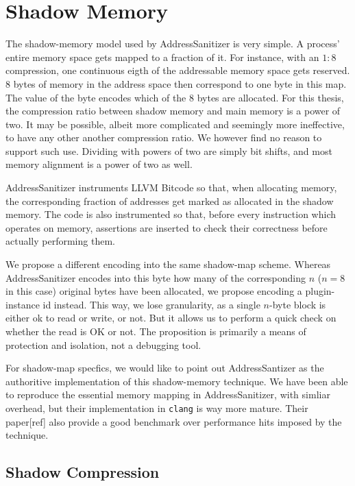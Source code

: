 \chapter {Shadow Memory}

The shadow-memory model used by AddressSanitizer is very simple. A process'
entire memory space gets mapped to a fraction of it. For instance, with an $1:8$
compression, one continuous eigth of the addressable memory space gets reserved.
8 bytes of memory in the address space then correspond to one byte in this
map. The value of the byte encodes which of the 8 bytes are allocated. For this
thesis, the compression ratio between shadow memory and main memory is a power
of two. It may be possible, albeit more complicated and seemingly more
ineffective, to have any other another compression ratio. We however find no
reason to support such use. Dividing with powers of two are simply bit shifts,
and most memory alignment is a power of two as well.

AddressSanitizer instruments LLVM Bitcode so that, when allocating memory, the
corresponding fraction of addresses get marked as allocated in the shadow
memory. The code is also instrumented so that, before every instruction which
operates on memory, assertions are inserted to check their correctness before
actually performing them.

We propose a different encoding into the same shadow-map scheme. Whereas
AddressSanitizer encodes into this byte how many of the corresponding $n$
($n = 8$ in this case) original bytes have been allocated, we propose encoding a
plugin-instance id instead. This way, we lose granularity, as a single $n$-byte
block is either ok to read or write, or not. But it allows us to perform a quick
check on whether the read is OK or not. The proposition is primarily a means of
protection and isolation, not a debugging tool.

For shadow-map specfics, we would like to point out AddressSantizer as the
authoritive implementation of this shadow-memory technique. We have been able to
reproduce the essential memory mapping in AddressSanitizer, with simliar
overhead, but their implementation in \texttt{clang} is way more mature. Their
paper[ref] also provide a good benchmark over performance hits imposed by the
technique.


\section {Shadow Compression}


